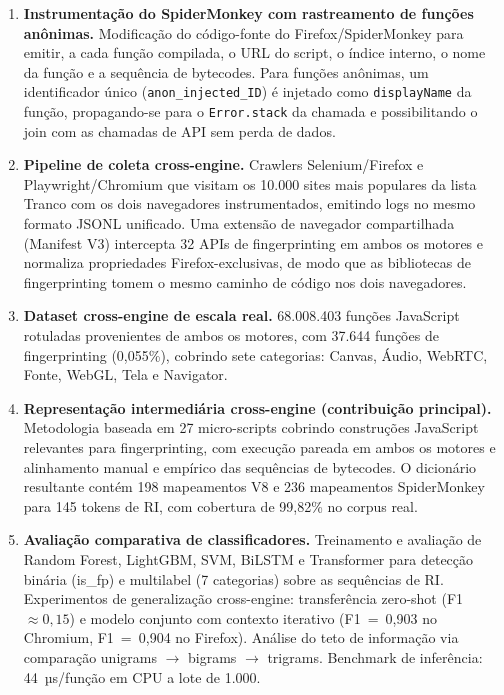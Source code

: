 \begin{enumerate}

\item \textbf{Instrumentação do SpiderMonkey com rastreamento de funções
anônimas.} Modificação do código-fonte do Firefox/SpiderMonkey para emitir, a
cada função compilada, o URL do script, o índice interno, o nome da função e a
sequência de bytecodes. Para funções anônimas, um identificador único
(\texttt{anon\_injected\_ID}) é injetado como \texttt{displayName} da função,
propagando-se para o \texttt{Error.stack} da chamada e possibilitando o
join com as chamadas de API sem perda de dados.

\item \textbf{Pipeline de coleta cross-engine.} Crawlers
Selenium/Firefox e Playwright/Chromium que visitam os 10.000 sites mais
populares da lista Tranco com os dois navegadores instrumentados, emitindo logs no
mesmo formato JSONL unificado. Uma extensão de navegador compartilhada (Manifest
V3) intercepta 32 APIs de fingerprinting em ambos os motores e normaliza
propriedades Firefox-exclusivas, de modo que as bibliotecas de
fingerprinting tomem o mesmo caminho de código nos dois navegadores.

\item \textbf{Dataset cross-engine de escala real.} 68.008.403 funções
JavaScript rotuladas provenientes de ambos os motores, com 37.644 funções de
fingerprinting (0,055\%), cobrindo sete categorias: Canvas, Áudio, WebRTC,
Fonte, WebGL, Tela e Navigator.

\item \textbf{Representação intermediária cross-engine (contribuição principal).}
Metodologia baseada em 27 micro-scripts cobrindo construções JavaScript relevantes
para fingerprinting, com execução pareada em ambos os motores e alinhamento
manual e empírico das sequências de bytecodes. O dicionário resultante contém 198
mapeamentos V8 e 236 mapeamentos SpiderMonkey para 145 tokens de RI, com cobertura
de 99,82\% no corpus real.

\item \textbf{Avaliação comparativa de classificadores.} Treinamento e avaliação
de Random Forest, LightGBM, SVM, BiLSTM e Transformer para detecção binária (is\_fp)
e multilabel (7 categorias) sobre as sequências de RI. Experimentos de
generalização cross-engine: transferência zero-shot (F1 $\approx 0{,}15$) e modelo
conjunto com contexto iterativo (F1~=~0,903 no Chromium, F1~=~0,904 no Firefox).
Análise do teto de informação via comparação
unigrams $\to$ bigrams $\to$ trigrams. Benchmark de inferência: 44~µs/função em
CPU a lote de 1.000.

\end{enumerate}

